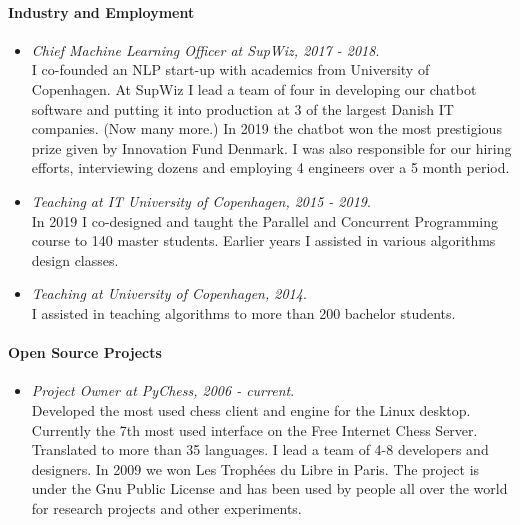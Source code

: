 \documentclass[11pt]{article}
\begin{document}
\paragraph{Industry and Employment}
\begin{itemize}
      \item[]
      \emph{Chief Machine Learning Officer at SupWiz, 2017 - 2018}.
      \\
      I co-founded an NLP start-up with academics from University of Copenhagen.
               At SupWiz I lead a team of four in developing our chatbot software and putting it into production at 3 of the largest Danish IT companies. (Now many more.)
               In 2019 the chatbot won the most prestigious prize given by Innovation Fund Denmark.
               I was also responsible for our hiring efforts, interviewing dozens and employing 4 engineers over a 5 month period.
               
      \item[]
      \emph{Teaching at IT University of Copenhagen, 2015 - 2019}.
      \\
      In 2019 I co-designed and taught the Parallel and Concurrent Programming course to 140 master students.
               Earlier years I assisted in various algorithms design classes.
            
      \item[]
      \emph{Teaching at University of Copenhagen, 2014}.
      \\
      I assisted in teaching algorithms to more than 200 bachelor students.
\end{itemize}

\paragraph{Open Source Projects}
\begin{itemize}
      \item[]
      \emph{Project Owner at PyChess, 2006 - current}.
      \\
      Developed the most used chess client and engine for the Linux desktop. Currently the 7th most used interface on the Free Internet Chess Server. Translated to more than 35 languages. I lead a team of 4-8 developers and designers. In 2009 we won Les Trophées du Libre in Paris. The project is under the Gnu Public License and has been used by people all over the world for research projects and other experiments.
\end{itemize}
\end{document}
